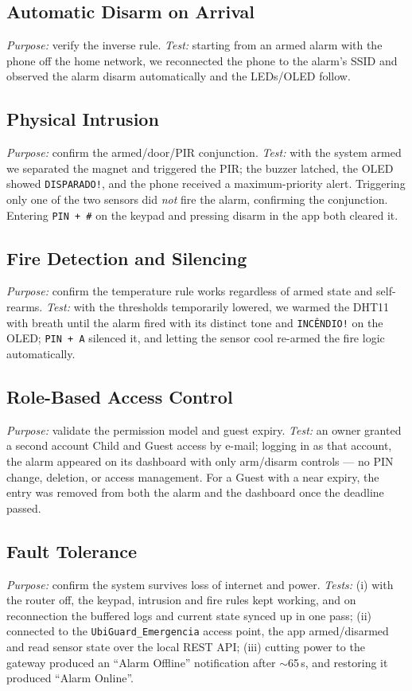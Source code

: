 \documentclass[10pt,twocolumn]{article}
\begin{document}
\subsection{Automatic Disarm on Arrival}
\emph{Purpose:} verify the inverse rule. \emph{Test:} starting from an armed alarm with the phone off the home network, we reconnected the phone to the alarm's SSID and observed the alarm disarm automatically and the LEDs/OLED follow.

\subsection{Physical Intrusion}
\emph{Purpose:} confirm the armed/door/PIR conjunction. \emph{Test:} with the system armed we separated the magnet and triggered the PIR; the buzzer latched, the OLED showed \texttt{DISPARADO!}, and the phone received a maximum-priority alert. Triggering only one of the two sensors did \emph{not} fire the alarm, confirming the conjunction. Entering \texttt{PIN + \#} on the keypad and pressing disarm in the app both cleared it.

\subsection{Fire Detection and Silencing}
\emph{Purpose:} confirm the temperature rule works regardless of armed state and self-rearms. \emph{Test:} with the thresholds temporarily lowered, we warmed the DHT11 with breath until the alarm fired with its distinct tone and \texttt{INCÊNDIO!} on the OLED; \texttt{PIN + A} silenced it, and letting the sensor cool re-armed the fire logic automatically.

\subsection{Role-Based Access Control}
\emph{Purpose:} validate the permission model and guest expiry. \emph{Test:} an owner granted a second account Child and Guest access by e-mail; logging in as that account, the alarm appeared on its dashboard with only arm/disarm controls --- no PIN change, deletion, or access management. For a Guest with a near expiry, the entry was removed from both the alarm and the dashboard once the deadline passed.

\subsection{Fault Tolerance}
\emph{Purpose:} confirm the system survives loss of internet and power. \emph{Tests:} (i) with the router off, the keypad, intrusion and fire rules kept working, and on reconnection the buffered logs and current state synced up in one pass; (ii) connected to the \texttt{UbiGuard\_Emergencia} access point, the app armed/disarmed and read sensor state over the local REST API; (iii) cutting power to the gateway produced an ``Alarm Offline'' notification after $\sim$65\,s, and restoring it produced ``Alarm Online''.
\end{document}
